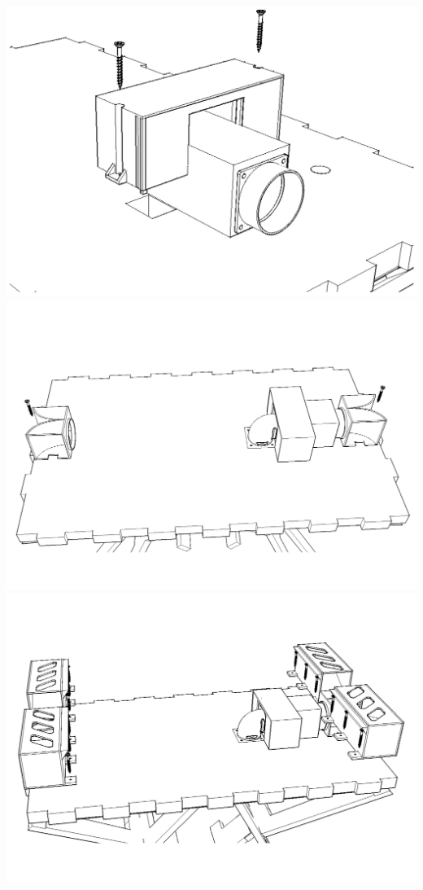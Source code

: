 \documentclass{article}
\begin{document}
\begin{center}
	\includegraphics[width=\hsize]{assembling/step7.png}
	\includegraphics[width=\hsize]{assembling/step8.png}
	\includegraphics[width=\hsize]{assembling/step9.png}

\end{center}
\end{document}
